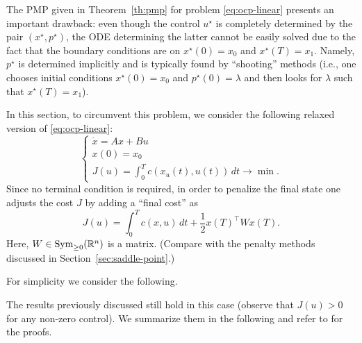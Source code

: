 The PMP given in Theorem~\ref{th:pmp} for problem \eqref{eq:ocp-linear} presents an important drawback: even though the control $u^\star$ is completely determined by the pair $(x^\star,p^\star)$, the ODE determining the latter cannot be easily solved due to the fact that the boundary conditions are on $x^\star(0)=x_0$ and $x^\star (T)=x_1$. 
Namely, $p^\star$ is determined implicitly and is typically found by ``shooting'' methods (i.e., one chooses initial conditions $x^\star(0)=x_0$ and $p^\star(0)=\lambda$ and then looks for $\lambda$ such that $x^\star(T)=x_1$).

In this section, to circumvent this problem, we consider the following relaxed version of \eqref{eq:ocp-linear}:
\begin{equation}
   \label{eq:ocp-linear-no-terminal}
   \begin{cases}
    \dot x = A x + Bu \\
    x(0)=x_0 \\
    J(u) = \int_0^T c(x_u(t),u(t))\, dt \rightarrow \min.
   \end{cases} 
\end{equation}
Since no terminal condition is required, in order to penalize the final state one adjusts the cost $J$ by adding a ``final cost'' as
\begin{equation}
    \label{eq:J-no-terminal}
    J(u) = \int_0^T c(x,u)\, dt + \frac12 x(T)^\top W x(T).
\end{equation}
Here, $W\in \operatorname{Sym}_{\ge 0}(\mathbb{R}^n)$ is a matrix. 
(Compare with the penalty methods discussed in Section~\ref{sec:saddle-point}.)

For simplicity we consider the following.


The results previously discussed still hold in this case (observe that $J(u)>0$ for any non-zero control). 
We summarize them in the following and refer to \cite{trelatControle2005} for the proofs.

